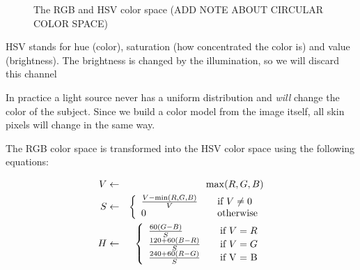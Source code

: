 \begin{figure}[htbp]
  \centering
{}
\hspace{0.01\linewidth}
  \caption{The RGB and HSV color space (ADD NOTE ABOUT CIRCULAR COLOR SPACE)}
  \label{fig:colorspaces}
\end{figure}

HSV stands for hue (color), saturation (how concentrated the color is) and value (brightness). The brightness is changed by the illumination, so we will discard this channel

In practice a light source never has a uniform distribution and \emph{will} change the color of the subject. Since we build a color model from the image itself, all skin pixels will change in the same way. 

The RGB color space is transformed into the HSV color space using the following equations:


\begin{eqnarray}
  V & \leftarrow & \max(R,G,B) \\
  S & \leftarrow & \left\{
  \begin{array}{l l}
    \frac{V-\min(R, G, B)}{V} & \quad \text{if $V \neq 0$} \\
    0 						  & \quad \text{otherwise} \\
  \end{array} \right.\\
  H & \leftarrow & \left\{
  \begin{array}{l l}
    \frac{60(G - B)}{S}     & \quad \text{if $V = R$} \\
    \frac{120 + 60(B-R)}{S} & \quad \text{if $V = G$} \\
    \frac{240 + 60(R-G)}{S} & \quad \text{if V = B} \\
  \end{array} \right.\\
\end{eqnarray}


